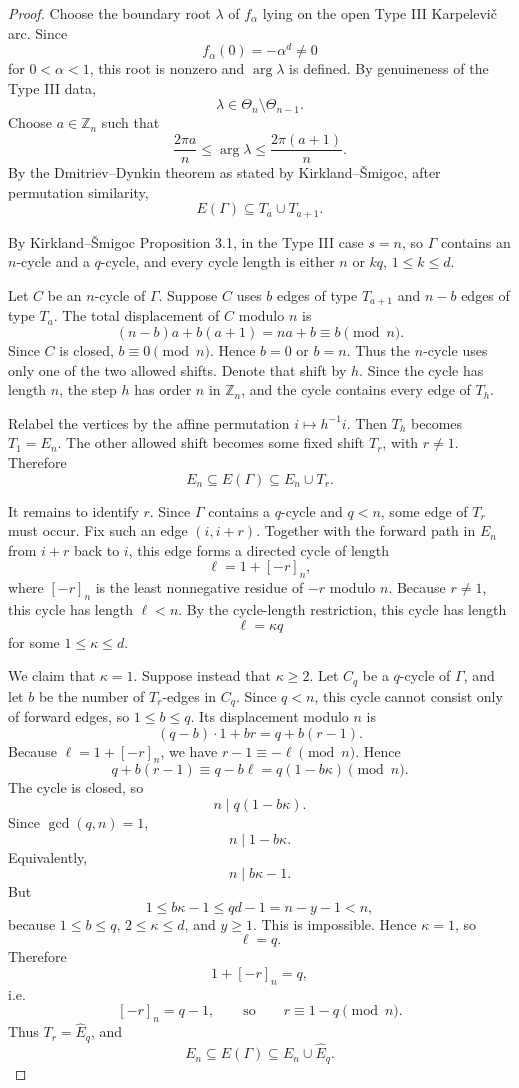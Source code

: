 \documentclass[11pt]{article}
\numberwithin{equation}{section}
\newcommand{\Zn}{\mathbb Z_n}
\newcommand{\Ehat}{\widehat E_q}
\begin{document}
\begin{proof}
Choose the boundary root $\lambda$ of $f_\alpha$ lying on the open Type III
Karpelevi\v{c} arc.
Since
\[
        f_\alpha(0)=-\alpha^d\ne0
\]
for $0<\alpha<1$, this root is nonzero and $\arg\lambda$ is defined. By
genuineness of the Type III data,
\[
        \lambda\in\Theta_n\setminus\Theta_{n-1}.
\]
Choose $a\in\Zn$ such that
\[
        \frac{2\pi a}{n}\le \arg\lambda\le\frac{2\pi(a+1)}{n}.
\]
By the Dmitriev--Dynkin theorem as stated by Kirkland--\v{S}migoc, after
permutation similarity,
\[
        E(\Gamma)\subseteq T_a\cup T_{a+1}.
\]

By Kirkland--\v{S}migoc Proposition 3.1, in the Type III case $s=n$, so
$\Gamma$ contains an $n$-cycle and a $q$-cycle, and every cycle length is
either $n$ or $kq$, $1\le k\le d$.

Let $C$ be an $n$-cycle of $\Gamma$. Suppose $C$ uses $b$ edges of type
$T_{a+1}$ and $n-b$ edges of type $T_a$. The total displacement of $C$ modulo
$n$ is
\[
        (n-b)a+b(a+1)=na+b\equiv b\pmod n.
\]
Since $C$ is closed, $b\equiv0\pmod n$. Hence $b=0$ or $b=n$. Thus the
$n$-cycle uses only one of the two allowed shifts. Denote that shift by $h$.
Since the cycle has length $n$, the step $h$ has order $n$ in $\Zn$, and the
cycle contains every edge of $T_h$.

Relabel the vertices by the affine permutation $i\mapsto h^{-1}i$. Then
$T_h$ becomes $T_1=E_n$. The other allowed shift becomes some fixed shift
$T_r$, with $r\ne1$. Therefore
\[
        E_n\subseteq E(\Gamma)\subseteq E_n\cup T_r.
\]

It remains to identify $r$. Since $\Gamma$ contains a $q$-cycle and $q<n$,
some edge of $T_r$ must occur. Fix such an edge $(i,i+r)$. Together with the
forward path in $E_n$ from $i+r$ back to $i$, this edge forms a directed cycle
of length
\[
        \ell=1+[-r]_n,
\]
where $[-r]_n$ is the least nonnegative residue of $-r$ modulo $n$. Because
$r\ne1$, this cycle has length $\ell<n$.
By the cycle-length restriction, this cycle has length
\[
        \ell=\kappa q
\]
for some $1\le \kappa\le d$.

We claim that $\kappa=1$. Suppose instead that $\kappa\ge2$. Let $C_q$ be a
$q$-cycle of $\Gamma$, and let $b$ be the number of $T_r$-edges in $C_q$.
Since $q<n$, this cycle cannot consist only of forward edges, so
$1\le b\le q$. Its displacement modulo $n$ is
\[
        (q-b)\cdot1+br=q+b(r-1).
\]
Because $\ell=1+[-r]_n$, we have $r-1\equiv-\ell\pmod n$. Hence
\[
        q+b(r-1)\equiv q-b\ell=q(1-b\kappa)\pmod n.
\]
The cycle is closed, so
\[
        n\mid q(1-b\kappa).
\]
Since $\gcd(q,n)=1$,
\[
        n\mid 1-b\kappa.
\]
Equivalently,
\[
        n\mid b\kappa-1.
\]
But
\[
        1\le b\kappa-1\le qd-1=n-y-1<n,
\]
because $1\le b\le q$, $2\le\kappa\le d$, and $y\ge1$. This is impossible.
Hence $\kappa=1$, so
\[
        \ell=q.
\]
Therefore
\[
        1+[-r]_n=q,
\]
i.e.
\[
        [-r]_n=q-1,
        \qquad\text{so}\qquad
        r\equiv1-q\pmod n.
\]
Thus $T_r=\Ehat$, and
\[
        E_n\subseteq E(\Gamma)\subseteq E_n\cup\Ehat.
\]


\end{proof}
\end{document}
